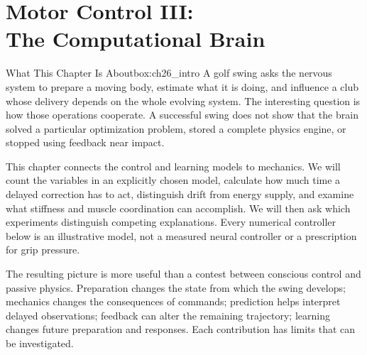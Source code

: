 \chapter[Motor Control III: The Computational Brain]{Motor Control III:\\The Computational Brain}
\label{ch:remarkable_brain}

\begin{laymansbox}{What This Chapter Is About}{box:ch26_intro}
A golf swing asks the nervous system to prepare a moving body, estimate what it is doing, and influence a club whose delivery depends on the whole evolving system. The interesting question is how those operations cooperate. A successful swing does not show that the brain solved a particular optimization problem, stored a complete physics engine, or stopped using feedback near impact.

This chapter connects the control and learning models to mechanics. We will count the variables in an explicitly chosen model, calculate how much time a delayed correction has to act, distinguish drift from energy supply, and examine what stiffness and muscle coordination can accomplish. We will then ask which experiments distinguish competing explanations. Every numerical controller below is an illustrative model, not a measured neural controller or a prescription for grip pressure.

The resulting picture is more useful than a contest between conscious control and passive physics. Preparation changes the state from which the swing develops; mechanics changes the consequences of commands; prediction helps interpret delayed observations; feedback can alter the remaining trajectory; learning changes future preparation and responses. Each contribution has limits that can be investigated.
\end{laymansbox}

